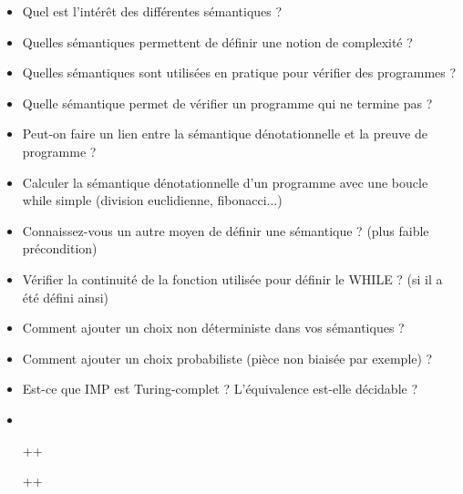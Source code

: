 \documentclass{agregfiche}
\begin{document}
\begin{itemize}
    \item Quel est l'intérêt des différentes sémantiques ?
    \item Quelles sémantiques permettent de définir une notion de complexité ?
%        
    \item Quelles sémantiques sont utilisées en pratique pour vérifier des programmes ? 
    
    \item Quelle sémantique permet de vérifier un programme qui ne termine pas ?
    
    \item Peut-on faire un lien entre la sémantique dénotationnelle
        et la preuve de programme ?
        
    \item Calculer la sémantique dénotationnelle d'un programme 
        avec une boucle while simple (division euclidienne, fibonacci...)
%        
    \item Connaissez-vous un autre moyen de définir une sémantique ?
        (plus faible précondition)
    \item Vérifier la continuité de la fonction utilisée pour définir le WHILE ? (si il a été défini ainsi)
    \item Comment ajouter un choix non déterministe dans 
        vos sémantiques ?
    \item Comment ajouter un choix probabiliste (pièce non biaisée par exemple)
        ?
        \item Est-ce que IMP est Turing-complet ? L'équivalence est-elle décidable ?
\end{itemize}

\secreferences

\begin{itemize}
\item 
\end{itemize}

\secdev

\begin{itemize}
\item[++]  

\item[++]  


\end{itemize}
\end{document}

